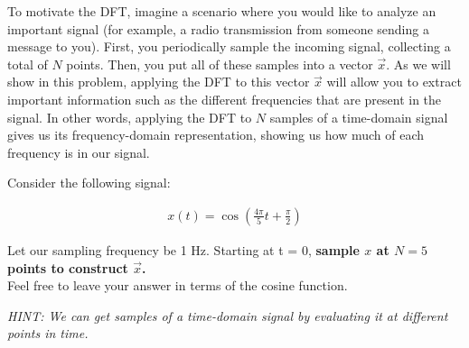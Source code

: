 
To motivate the DFT, imagine a scenario where you would like to analyze an important signal
(for example, a radio transmission from someone sending a message to you).
First, you periodically sample the incoming signal, collecting a total of $N$
points. Then, you put all of these samples into a vector $\vec{x}$. As we will show in this
problem, applying the DFT to this vector $\vec{x}$ will allow you to extract important information such as
the different frequencies that are present in the signal. In other words, applying the DFT to $N$ samples
of a time-domain signal gives us its frequency-domain representation, showing us how much of each frequency is in our signal.


\begin{enumerate}

  \qitem

Consider the following signal:

\begin{align*}
x(t) = \cos(\frac{4\pi}{5}t + \frac{\pi}{2})
\end{align*}

Let our sampling frequency be 1 Hz. Starting at t = 0, {\bf sample $x$ at $N = 5$ points to construct $\vec{x}$. } \\
Feel free to leave your answer in terms of the cosine function.

{\em HINT:
We can get samples of a time-domain signal by evaluating it at different points in time. \\
}



\end{enumerate}
